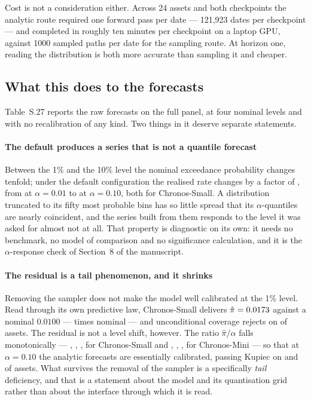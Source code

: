 \documentclass[preprint,11pt,authoryear]{elsarticle}
\newcommand{\1}{\boldsymbol{1}}
\begin{document}
Cost is not a consideration either. Across 24 assets and both checkpoints the
analytic route required one forward pass per date --- 121{,}923 dates per
checkpoint --- and completed in roughly ten minutes per checkpoint on a laptop
GPU, against 1000 sampled paths per date for the sampling route. At horizon one,
reading the distribution is both more accurate than sampling it and cheaper.

\subsection{What this does to the forecasts}
\label{app:mech_consequence}

Table~S.27 reports the raw forecasts on the full panel, at four nominal levels
and with no recalibration of any kind. Two things in it deserve separate
statements.

\paragraph{The default produces a series that is not a quantile forecast}
Between the 1\% and the 10\% level the nominal exceedance probability changes
tenfold; under the default configuration the realised rate changes by a factor of \nLitAlphaResp, from \nPiSmallDefaultOne{} at $\alpha = 0.01$ to \nPiSmallDefaultTen{} at $\alpha = 0.10$, both for Chronos-Small. A distribution truncated
to its fifty most probable bins has so little spread that its $\alpha$-quantiles
are nearly coincident, and the series built from them responds to the level it
was asked for almost not at all. That property is diagnostic on its own: it needs
no benchmark, no model of comparison and no significance calculation, and it is
the $\alpha$-response check of Section~8 of the manuscript.

\paragraph{The residual is a tail phenomenon, and it shrinks} Removing the
sampler does not make the model well calibrated at the 1\% level. Read through
its own predictive law, Chronos-Small delivers $\hat\pi = 0.0173$
against a nominal $0.0100$ --- \nRatioSmallAnalyticOne{} times nominal --- and
unconditional coverage rejects on \nMainKupRejRawSmallAnalyticOne{} of
\nMainAssets{} assets. The residual is
not a level shift, however. The ratio $\hat\pi/\alpha$ falls monotonically ---
\nRatioSmallAnalyticOne, \nLitRatioSmallTwoFive, \nLitRatioSmallFive, \nRatioSmallAnalyticTen{} for Chronos-Small
and \nRatioMiniAnalyticOne, \nLitRatioMiniTwoFive, \nLitRatioMiniFive, \nRatioMiniAnalyticTen{} for Chronos-Mini
--- so that at $\alpha = 0.10$ the analytic forecasts are essentially calibrated,
passing Kupiec on \nKupPassSmallAnalyticTen{} and \nKupPassMiniAnalyticTen{} of
\nMainAssets{} assets. What survives the removal of the sampler is a specifically
\emph{tail} deficiency, and that is a statement about the model and its
quantisation grid rather than about the interface through which it is read.
\end{document}
